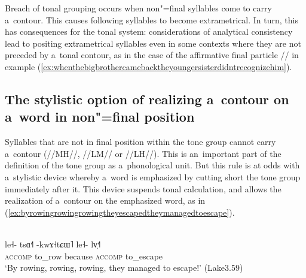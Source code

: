 Breach of tonal grouping occurs when non"=final syllables come to carry a~contour. This causes following syllables to become extrametrical. In turn, this has consequences for the tonal system: considerations of analytical consistency lead to positing extrametrical syllables even in some contexts where they are not preceded by a~tonal contour, as in the case of the affirmative final particle // in example (\ref{ex:whenthebigbrothercamebacktheyoungersisterdidntrecognizehim}).

\subsection[Non"=final contours as a~stylistic option]{The stylistic option of realizing a~contour on a~word in non"=final position }
\label{sec:thestylisticoptionofrealizingacontouronawordinnonfinalposition}

Syllables that are not in final position within the tone group cannot carry a~contour (\mbox{//MH//}, \mbox{//LM//} or \mbox{//LH//}). This is an~important part
of the definition of the tone group as a~phonological unit. But this rule is at odds with a~stylistic
device whereby a~word is emphasized by cutting short the tone group immediately after it. This
device suspends tonal calculation, and allows the realization of a~contour on the emphasized word,
as in (\ref{ex:byrowingrowingrowingtheyescapedtheymanagedtoescape}).
\begin{exe}
  \ex
  \label{ex:byrowingrowingrowingtheyescapedtheymanagedtoescape}
  \\
  \gll le˧-		tsɑ˧˥		-kwɤ˧tɕɯ˥	le˧-		lv̩˧˥\\
  \textsc{accomp}	to\_row		because	\textsc{accomp}	to\_escape\\
  \glt ‘By rowing, rowing, rowing, they managed to escape!’ (Lake3.59)
\end{exe}

